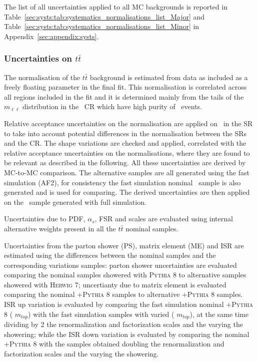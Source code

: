 The list of all uncertainties applied to 
all MC backgrounds is reported in
Table~\ref{sec:systs:tab:systematics_normalisations_list_Major} and 
Table~\ref{sec:systs:tab:systematics_normalisations_list_Minor} 
in Appendix~\ref{sec:appendix:systs}.








\subsubsection{Uncertainties on \texorpdfstring{$t\bar{t}$}{ttbar}}
\label{sec:DiHiggs:ttbarsysts}

The normalisation of the $t\bar{t}$ background is estimated 
from data as included as a freely floating parameter in the final fit. 
This normalisation is correlated across all regions included 
in the fit and it is determined mainly from the tails of the 
$m_{\ell\ell}$ distribution in the \ZHF\ CR which have 
high purity of \ttbar\ events.

Relative acceptance uncertainties on the normalisation are applied on 
\ttbar\ in the SR
to take into account potential differences in the normalisation 
between the SRs and the CR. 
The shape variations are checked 
and applied, correlated with the relative 
acceptance uncertainties on the normalisations,
where they are found to be relevant as described in the following. 
All these uncertainties are derived by MC-to-MC comparison.
The alternative samples are all generated using the fast simulation (AF2), 
for consistency the fast simulation nominal \ttbar\ sample is also generated
and is used for comparing. The derived uncertainties are then applied on the
\ttbar\ sample generated with full simulation.

Uncertainties due to PDF, $\alpha_s$, FSR and scales 
are evaluated using internal alternative weights 
present in all the $t\bar{t}$ nominal samples. 




Uncertainties from the parton shower (PS), 
matrix element (ME) and ISR are estimated using 
the differences between the nominal samples and 
the corresponding variations samples:
parton shower uncertainties 
are evaluated comparing the nominal samples showered with \textsc{Pythia 8} 
to alternative samples showered with \textsc{Herwig 7};
uncertianty due to matrix element is evaluated comparing 
the nominal \POWHEG+\textsc{Pythia 8} samples to 
alternative \AMCatNLO+\textsc{Pythia 8} samples. 
ISR up variation is evaluated by comparing the 
fast simulation nominal \POWHEG+\textsc{Pythia 8} ( $m_{top}$) with 
the fast simulation samples with varied \hdamp ( $m_{top}$), 
at the same time dividing by 2 the renormalization 
and factorization scales and the varying the showering; 
while the ISR down variation is evaluated by comparing 
the nominal \POWHEG+\textsc{Pythia 8} with the samples obtained 
doubling the renormalization and factorization scales 
and the varying the showering.


